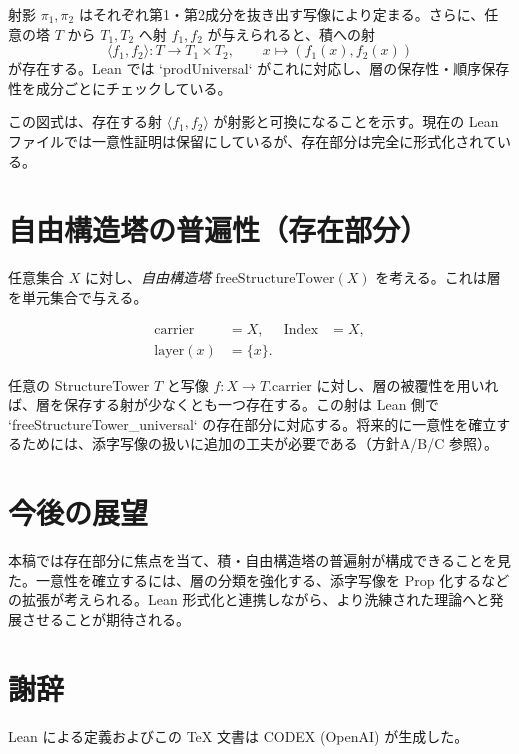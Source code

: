 \documentclass[a4paper]{ltjsarticle}
\begin{document}
射影 $\pi_1, \pi_2$ はそれぞれ第1・第2成分を抜き出す写像により定まる。さらに、任意の塔 $T$ から $T_1, T_2$ へ射 $f_1, f_2$ が与えられると、積への射
\[
  \langle f_1, f_2 \rangle : T \to T_1 \times T_2,
  \qquad x \mapsto (f_1(x), f_2(x))
\]
が存在する。Lean では `prodUniversal` がこれに対応し、層の保存性・順序保存性を成分ごとにチェックしている。

\begin{center}
\end{center}

\noindent この図式は、存在する射 $\langle f_1, f_2 \rangle$ が射影と可換になることを示す。現在の Lean ファイルでは一意性証明は保留にしているが、存在部分は完全に形式化されている。

\section{自由構造塔の普遍性（存在部分）}

任意集合 $X$ に対し、\emph{自由構造塔} $\mathrm{freeStructureTower}(X)$ を考える。これは層を単元集合で与える。

\begin{align*}
  \mathrm{carrier} &= X, & \mathrm{Index} &= X, \\
  \mathrm{layer}(x) &= \{x\}.
\end{align*}

任意の StructureTower $T$ と写像 $f : X \to T.\mathrm{carrier}$ に対し、層の被覆性を用いれば、層を保存する射が少なくとも一つ存在する。この射は Lean 側で `freeStructureTower_universal` の存在部分に対応する。将来的に一意性を確立するためには、添字写像の扱いに追加の工夫が必要である（方針A/B/C 参照）。

\section{今後の展望}

本稿では存在部分に焦点を当て、積・自由構造塔の普遍射が構成できることを見た。一意性を確立するには、層の分類を強化する、添字写像を Prop 化するなどの拡張が考えられる。Lean 形式化と連携しながら、より洗練された理論へと発展させることが期待される。

\section*{謝辞}

Lean による定義およびこの TeX 文書は CODEX (OpenAI) が生成した。
\end{document}
